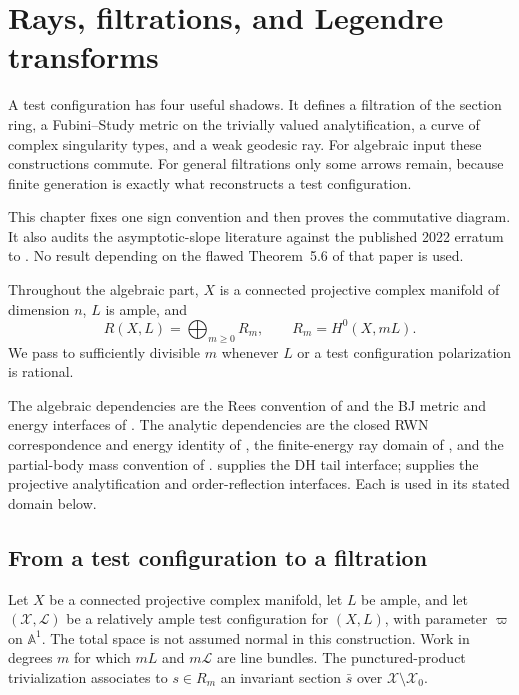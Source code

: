 \chapter{Rays, filtrations, and Legendre transforms}
\label{chap:rays-filtrations}

A test configuration has four useful shadows.
It defines a filtration of the section ring, a Fubini--Study metric on the
trivially valued analytification, a curve of complex singularity types, and
a weak geodesic ray.
For algebraic input these constructions commute.
For general filtrations only some arrows remain, because finite generation
is exactly what reconstructs a test configuration.

This chapter fixes one sign convention and then proves the commutative
diagram.
It also audits the asymptotic-slope literature against the published 2022
erratum to \cite{BHJ19}.
No result depending on the flawed Theorem~5.6 of that paper is used.

Throughout the algebraic part, $X$ is a connected projective complex manifold of
dimension $n$, $L$ is ample, and
\[
                       R(X,L)=\bigoplus_{m\geq0}R_m,
 \qquad R_m=H^0(X,mL).
\tag{65.1}\label{eq:rf-section-ring}
\]
We pass to sufficiently divisible $m$ whenever $L$ or a test
configuration polarization is rational.

The algebraic dependencies are the Rees convention of
 and the BJ metric and energy interfaces of
. The analytic dependencies are the closed
RWN correspondence and energy identity of ,
the finite-energy ray domain of ,
and the partial-body mass convention of .
 supplies the DH tail interface;
 supplies the projective analytification and
order-reflection interfaces. Each is used in its stated domain below.

\section{From a test configuration to a filtration}
\label{sec:rf-test-configuration-filtration}

Let $X$ be a connected projective complex manifold, let $L$ be ample, and let $(\mathcal X,\mathcal L)$ be a relatively ample test configuration for $(X,L)$, with parameter $\varpi$ on $\mathbb A^1$. The total space is not assumed normal in this construction. Work in degrees $m$ for which $mL$ and $m\mathcal L$ are line bundles. The punctured-product trivialization associates to $s\in R_m$ an invariant section $\bar s$ over $\mathcal X\setminus\mathcal X_0$.

